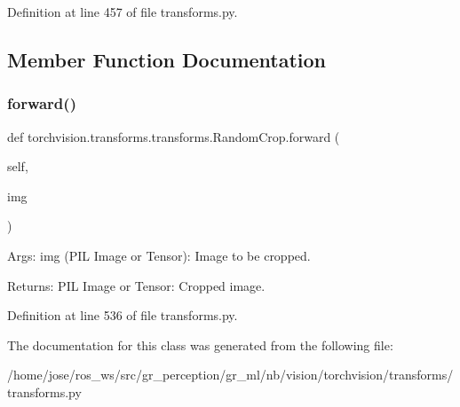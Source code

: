 Definition at line 457 of file transforms.\+py.



\subsection{Member Function Documentation}
\mbox{\label{classtorchvision_1_1transforms_1_1transforms_1_1RandomCrop_a3be3e16ad7fe9fb4dfe01721804ec901}} 
\subsubsection{\texorpdfstring{forward()}{forward()}}
{\footnotesize\ttfamily def torchvision.\+transforms.\+transforms.\+Random\+Crop.\+forward (\begin{DoxyParamCaption}\item[{}]{self,  }\item[{}]{img }\end{DoxyParamCaption})}

\begin{DoxyVerb}Args:
    img (PIL Image or Tensor): Image to be cropped.

Returns:
    PIL Image or Tensor: Cropped image.
\end{DoxyVerb}
 

Definition at line 536 of file transforms.\+py.



The documentation for this class was generated from the following file\+:\begin{DoxyCompactItemize}
\item 
/home/jose/ros\+\_\+ws/src/gr\+\_\+perception/gr\+\_\+ml/nb/vision/torchvision/transforms/transforms.\+py\end{DoxyCompactItemize}
